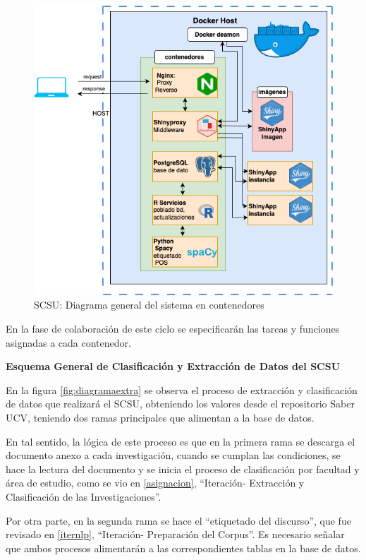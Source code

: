 \documentclass[
  12pt,
  openany]{book}
\begin{document}
\begin{figure}

{\centering \includegraphics[width=0.8\linewidth]{images/05-desarrollo/4_ciclo/digrama_contenedores_modulos} 

}

\caption{SCSU: Diagrama general del sistema en contenedores}\label{fig:diagramacontenedores}
\end{figure}

En la fase de colaboración de este ciclo se especificarán las tareas y funciones asignadas a cada contenedor.

\textbf{Esquema General de Clasificación y Extracción de Datos del SCSU}

En la figura \ref{fig:diagramaextra} se observa el proceso de extracción y clasificación de datos que realizará el SCSU, obteniendo los valores desde el repositorio Saber UCV, teniendo dos ramas principales que alimentan a la base de datos.

En tal sentido, la lógica de este proceso es que en la primera rama se descarga el documento anexo a cada investigación, cuando se cumplan las condiciones, se hace la lectura del documento y se inicia el proceso de clasificación por facultad y área de estudio, como se vio en \ref{asignacion}, ``Iteración- Extracción y Clasificación de las Investigaciones''.

Por otra parte, en la segunda rama se hace el ``etiquetado del discurso'', que fue revisado en \ref{iternlp}, ``Iteración- Preparación del Corpus''. Es necesario señalar que ambos procesos alimentarán a las correspondientes tablas en la base de datos.
\end{document}
